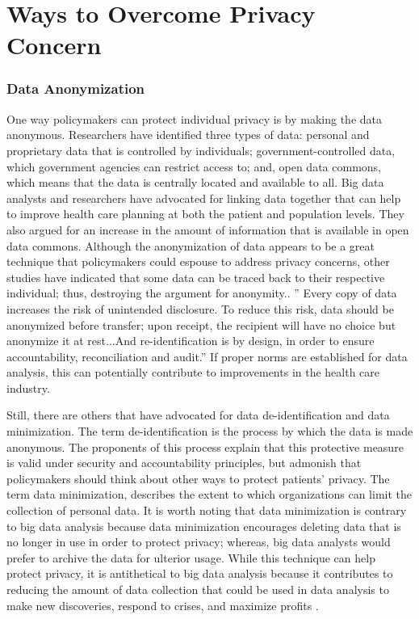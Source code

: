 \documentclass[sigconf]{acmart}
\begin{document}
\section{Ways to Overcome Privacy Concern}
\subsubsection{Data Anonymization}
One way policymakers can protect individual privacy is by making the data anonymous. Researchers have identified three types of data: personal and proprietary data that is controlled by individuals; government-controlled data, which government agencies can restrict access to; and, open data commons, which means that the data is centrally located and available to all. Big data analysts and researchers have advocated for linking data together that can help to improve health care planning at both the patient and population levels. They also argued for an increase in the amount of information that is available in open data commons. Although the anonymization of data appears to be a great technique that policymakers could espouse to address privacy concerns, other studies have indicated that some data can be traced back to their respective individual; thus, destroying the argument for anonymity.\cite{van2011health}. '' Every copy of data increases the risk of unintended disclosure. To reduce this risk, data should be anonymized before transfer; upon receipt, the recipient will have no choice but anonymize it at rest...And re-identification is by design, in order to ensure accountability, reconciliation and audit.'' If proper norms are established for data analysis, this can potentially contribute to improvements in the health care industry. 

Still, there are others that have advocated for data de-identification and data minimization. The term de-identification is the process by which the data is made anonymous. The proponents of this process explain that this protective measure is valid under security and accountability principles, but admonish that policymakers should think about other ways to protect patients' privacy. 
The term data minimization, describes the extent to which organizations can limit the collection of personal data. It is worth noting that data minimization is contrary to big data analysis because data minimization encourages deleting data that is no longer in use in order to protect privacy; whereas, big data analysts would prefer to archive the data for ulterior usage. While this technique can help protect privacy, it is antithetical to big data analysis because it contributes to reducing the amount of data collection that could be used in data analysis to make new discoveries, respond to crises, and maximize profits \cite{tene2012big}.
\end{document}
